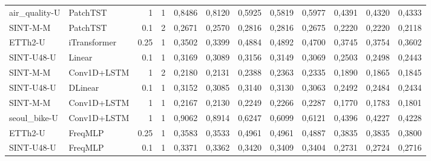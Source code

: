 \begin{longtable}{llrrrrrrrrrr}
air\_quality-U & PatchTST & 1 & 1 & 0,8486 & 0,8120 & 0,5925 & 0,5819 & 0,5977 & 0,4391 & 0,4320 & 0,4333 \\
SINT-M-M & PatchTST & 0.1 & 2 & 0,2671 & 0,2570 & 0,2816 & 0,2816 & 0,2675 & 0,2220 & 0,2220 & 0,2118 \\
ETTh2-U & iTransformer & 0.25 & 1 & 0,3502 & 0,3399 & 0,4884 & 0,4892 & 0,4700 & 0,3745 & 0,3754 & 0,3602 \\
SINT-U48-U & Linear & 0.1 & 1 & 0,3169 & 0,3089 & 0,3156 & 0,3149 & 0,3069 & 0,2503 & 0,2498 & 0,2443 \\
SINT-M-M & Conv1D+LSTM & 1 & 2 & 0,2180 & 0,2131 & 0,2388 & 0,2363 & 0,2335 & 0,1890 & 0,1865 & 0,1845 \\
SINT-U48-U & DLinear & 0.1 & 1 & 0,3152 & 0,3085 & 0,3140 & 0,3130 & 0,3063 & 0,2492 & 0,2484 & 0,2434 \\
SINT-M-M & Conv1D+LSTM & 1 & 1 & 0,2167 & 0,2130 & 0,2249 & 0,2266 & 0,2287 & 0,1770 & 0,1783 & 0,1801 \\
seoul\_bike-U & Conv1D+LSTM & 1 & 1 & 0,9062 & 0,8914 & 0,6247 & 0,6099 & 0,6121 & 0,4396 & 0,4227 & 0,4228 \\
ETTh2-U & FreqMLP & 0.25 & 1 & 0,3583 & 0,3533 & 0,4961 & 0,4961 & 0,4887 & 0,3835 & 0,3835 & 0,3800 \\
SINT-U48-U & FreqMLP & 0.1 & 1 & 0,3371 & 0,3362 & 0,3420 & 0,3409 & 0,3404 & 0,2731 & 0,2724 & 0,2716 \\
\end{longtable}
\normalsize

